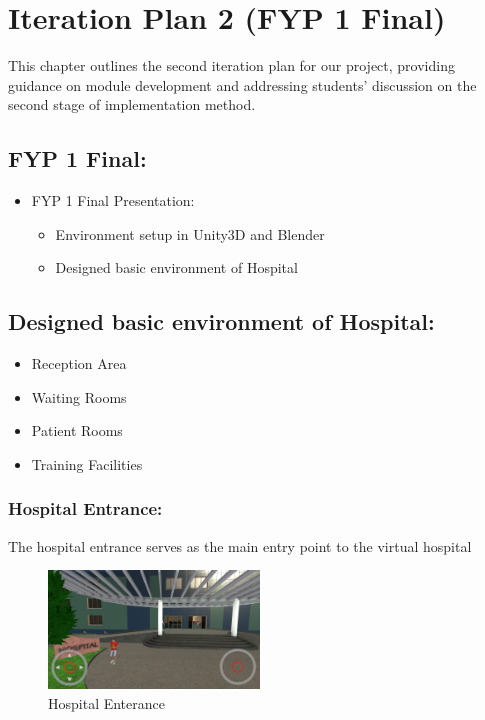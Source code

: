 \chapter{Iteration Plan 2 (FYP 1 Final)}
\label{ch:iter2}
This chapter outlines the second iteration plan for our project, providing guidance on module development and addressing students' discussion on the second stage of implementation method.

\section{FYP 1 Final:}
\begin{itemize}
    \item FYP 1 Final Presentation: \begin{itemize}
    \item Environment setup in Unity3D and Blender 
    \item Designed basic environment of Hospital
    \end{itemize}
\end{itemize}

\section{Designed basic environment of Hospital:}
	\begin{itemize}
	\item Reception Area
	\item Waiting Rooms
	\item Patient Rooms
	\item Training Facilities
\end{itemize}	
	
\subsection{Hospital Entrance:}
The hospital entrance serves as the main entry point to the virtual hospital
	\begin{figure}[h]
		\centering
		\includegraphics[width=0.5\textwidth, height=0.3\textheight]{Images/Hospital Enterance.png}
		\caption{Hospital Enterance}
		\label{fig:system-diagram}
	\end{figure}
\newline

